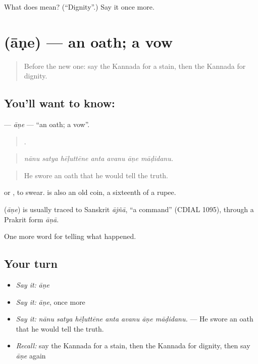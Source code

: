 \begin{tcolorbox}[breakable,colback=teal!4,colframe=teal!35!black,title={Before you move on}]
What does  mean? (\textquotedblleft{}Dignity\textquotedblright{}.) Say it once more.
\end{tcolorbox}
\section[\texorpdfstring{\kn{ಆಣೆ} (āṇe)}{ಆಣೆ (āṇe)}]{ (āṇe) — an oath; a vow}

\label{lesson:KA-C366-ane}



\begin{quote}
Before the new one: say the Kannada for a stain, then the Kannada for dignity.
\end{quote}

\subsection*{You'll want to know: }
\textbf{} — \emph{āṇe} — \textquotedblleft{}an oath; a vow\textquotedblright{}.

\begin{quote}
      .
\end{quote}

\begin{quote}
\emph{nānu satya hēḷuttēne anta avanu āṇe māḍidanu.}
\end{quote}

\begin{quote}
He swore an oath that he would tell the truth.
\end{quote}

  or  , to swear.  is also an old coin, a sixteenth of a rupee.

\begin{cousinweb}
\textbf{} (\emph{āṇe}) is usually traced to Sanskrit \emph{ājñā}, \textquotedblleft{}a command\textquotedblright{} (CDIAL 1095), through a Prakrit form \emph{āṇā}.
\end{cousinweb}

\begin{grammarlens}[title={What you've built}]
One more word for telling what happened.
\end{grammarlens}

\subsection*{Your turn}
\begin{itemize}
\raggedright
  \item \emph{Say it:} \emph{āṇe}
  \item \emph{Say it:} \emph{āṇe}, once more
  \item \emph{Say it:} \emph{nānu satya hēḷuttēne anta avanu āṇe māḍidanu.} — He swore an oath that he would tell the truth.
  \item \emph{Recall:} say the Kannada for a stain, then the Kannada for dignity, then say \emph{āṇe} again
\end{itemize}


